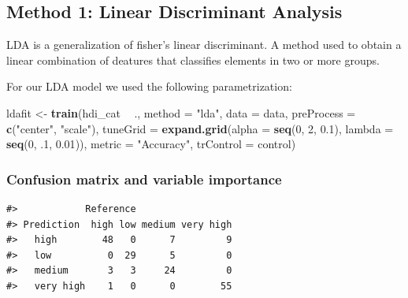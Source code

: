\documentclass[]{article}
\newenvironment{Shaded}{\begin{snugshade}}{\end{snugshade}}
\newcommand{\DataTypeTok}[1]{\textcolor[rgb]{0.13,0.29,0.53}{#1}}
\newcommand{\DecValTok}[1]{\textcolor[rgb]{0.00,0.00,0.81}{#1}}
\newcommand{\FloatTok}[1]{\textcolor[rgb]{0.00,0.00,0.81}{#1}}
\newcommand{\KeywordTok}[1]{\textcolor[rgb]{0.13,0.29,0.53}{\textbf{#1}}}
\newcommand{\NormalTok}[1]{#1}
\newcommand{\OperatorTok}[1]{\textcolor[rgb]{0.81,0.36,0.00}{\textbf{#1}}}
\newcommand{\StringTok}[1]{\textcolor[rgb]{0.31,0.60,0.02}{#1}}
\begin{document}
\normalsize

\hypertarget{method-1-linear-discriminant-analysis}{%
\subsection{Method 1: Linear Discriminant
Analysis}\label{method-1-linear-discriminant-analysis}}

LDA is a generalization of fisher's linear discriminant. A method used
to obtain a linear combination of deatures that classifies elements in
two or more groups.

For our LDA model we used the following parametrization:

\footnotesize

\begin{Shaded}
\begin{Highlighting}[]
\NormalTok{ldafit <-}\StringTok{ }\KeywordTok{train}\NormalTok{(hdi_cat }\OperatorTok{~}\StringTok{ }\NormalTok{., }\DataTypeTok{method =} \StringTok{"lda"}\NormalTok{, }\DataTypeTok{data =}\NormalTok{ data, }\DataTypeTok{preProcess =} \KeywordTok{c}\NormalTok{(}\StringTok{"center"}\NormalTok{, }\StringTok{"scale"}\NormalTok{),}
                \DataTypeTok{tuneGrid =} \KeywordTok{expand.grid}\NormalTok{(}\DataTypeTok{alpha =} \KeywordTok{seq}\NormalTok{(}\DecValTok{0}\NormalTok{, }\DecValTok{2}\NormalTok{, }\FloatTok{0.1}\NormalTok{), }\DataTypeTok{lambda =} \KeywordTok{seq}\NormalTok{(}\DecValTok{0}\NormalTok{, }\FloatTok{.1}\NormalTok{, }\FloatTok{0.01}\NormalTok{)),}
                \DataTypeTok{metric =} \StringTok{"Accuracy"}\NormalTok{, }\DataTypeTok{trControl =}\NormalTok{ control)}
\end{Highlighting}
\end{Shaded}

\normalsize

\hypertarget{confusion-matrix-and-variable-importance}{%
\subsubsection{Confusion matrix and variable
importance}\label{confusion-matrix-and-variable-importance}}

\footnotesize

\begin{verbatim}
#>            Reference
#> Prediction  high low medium very high
#>   high        48   0      7         9
#>   low          0  29      5         0
#>   medium       3   3     24         0
#>   very high    1   0      0        55
\end{verbatim}
\end{document}
